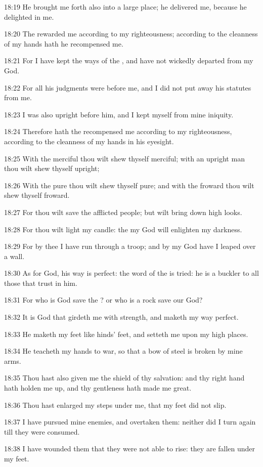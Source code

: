 18:19 He brought me forth also into a large place; he delivered me, because he delighted in me.

18:20 The \LORD rewarded me according to my righteousness; according to the cleanness of my hands hath he recompensed me.

18:21 For I have kept the ways of the \LORD, and have not wickedly departed from my God.

18:22 For all his judgments were before me, and I did not put away his statutes from me.

18:23 I was also upright before him, and I kept myself from mine iniquity.

18:24 Therefore hath the \LORD recompensed me according to my righteousness, according to the cleanness of my hands in his eyesight.

18:25 With the merciful thou wilt shew thyself merciful; with an upright man thou wilt shew thyself upright;

18:26 With the pure thou wilt shew thyself pure; and with the froward thou wilt shew thyself froward.

18:27 For thou wilt save the afflicted people; but wilt bring down high looks.

18:28 For thou wilt light my candle: the \LORD my God will enlighten my darkness.

18:29 For by thee I have run through a troop; and by my God have I leaped over a wall.

18:30 As for God, his way is perfect: the word of the \LORD is tried: he is a buckler to all those that trust in him.

18:31 For who is God save the \LORD? or who is a rock save our God?

18:32 It is God that girdeth me with strength, and maketh my way perfect.

18:33 He maketh my feet like hinds' feet, and setteth me upon my high places.

18:34 He teacheth my hands to war, so that a bow of steel is broken by mine arms.

18:35 Thou hast also given me the shield of thy salvation: and thy right hand hath holden me up, and thy gentleness hath made me great.

18:36 Thou hast enlarged my steps under me, that my feet did not slip.

18:37 I have pursued mine enemies, and overtaken them: neither did I turn again till they were consumed.

18:38 I have wounded them that they were not able to rise: they are fallen under my feet.

